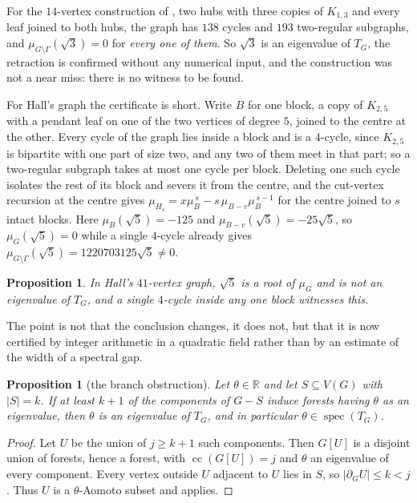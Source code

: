 \documentclass[11pt]{article}
\newtheorem{proposition}[theorem]{Proposition}
\theoremstyle{remark}
\begin{document}
For the $14$-vertex construction of \cite{Supp}, two hubs with three copies of $K_{1,3}$ and every
leaf joined to both hubs, the graph has $138$ cycles and $193$ two-regular subgraphs, and
$\mu_{G\setminus\Gamma}(\sqrt3)=0$ for \emph{every one of them}. So $\sqrt3$ is an eigenvalue of
$T_G$, the retraction is confirmed without any numerical input, and the construction was not a near
miss: there is no witness to be found.

For Hall's graph the certificate is short. Write $B$ for one block, a copy of $K_{2,5}$ with a
pendant leaf on one of the two vertices of degree $5$, joined to the centre at the other. Every
cycle of the graph lies inside a block and is a $4$-cycle, since $K_{2,5}$ is bipartite with one
part of size two, and any two of them meet in that part; so a two-regular subgraph takes at most one
cycle per block. Deleting one such cycle isolates the rest of its block and severs it from the
centre, and the cut-vertex recursion at the centre gives
$\mu_{H_s}=x\mu_B^{\,s}-s\,\mu_{B-v}\mu_B^{\,s-1}$ for the centre joined to $s$ intact blocks. Here
$\mu_B(\sqrt5)=-125$ and $\mu_{B-v}(\sqrt5)=-25\sqrt5$, so $\mu_G(\sqrt5)=0$ while a single
$4$-cycle already gives $\mu_{G\setminus\Gamma}(\sqrt5)=1220703125\sqrt5\ne0$.

\begin{proposition}\label{prop:hallexact}
In Hall's $41$-vertex graph, $\sqrt5$ is a root of $\mu_G$ and is not an eigenvalue of $T_G$, and a
single $4$-cycle inside any one block witnesses this.
\end{proposition}

The point is not that the conclusion changes, it does not, but that it is now certified by integer
arithmetic in a quadratic field rather than by an estimate of the width of a spectral gap.

\begin{proposition}[the branch obstruction]\label{prop:obstruction}
Let $\theta\in\mathbb R$ and let $S\subseteq V(G)$ with $|S|=k$. If at least $k+1$ of the components
of $G-S$ induce forests having $\theta$ as an eigenvalue, then $\theta$ is an eigenvalue of $T_G$,
and in particular $\theta\in\operatorname{spec}(T_G)$.
\end{proposition}

\begin{proof}
Let $U$ be the union of $j\ge k+1$ such components. Then $G[U]$ is a disjoint union of forests,
hence a forest, with $\operatorname{cc}(G[U])=j$ and $\theta$ an eigenvalue of every component. Every
vertex outside $U$ adjacent to $U$ lies in $S$, so $|\partial_G U|\le k<j$. Thus $U$ is a
$\theta$-Aomoto subset and \cite{BGM} applies.
\end{proof}
\end{document}
